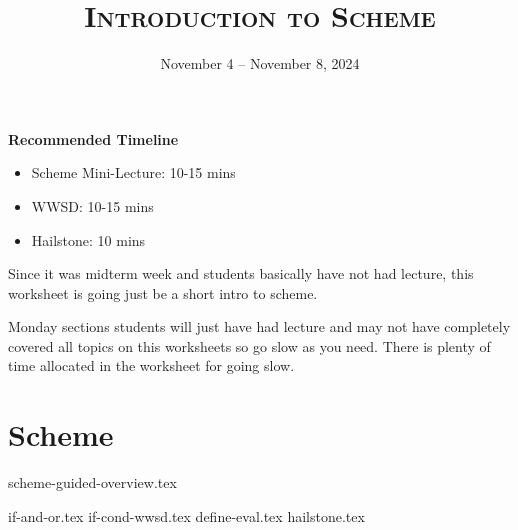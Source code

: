 \documentclass{exam}
\title{\textsc{Introduction to Scheme}}
\date{November 4 -- November 8, 2024}
\begin{document}
\maketitle
\begin{guide}
    \textbf{Recommended Timeline}
    \begin{itemize}
      \item Scheme Mini-Lecture: 10-15 mins
      \item WWSD: 10-15 mins
      \item Hailstone: 10 mins
    \end{itemize}

\begin{meta}
    Since it was midterm week and students basically have not had lecture, this worksheet is going just be a short intro to scheme. 
    
    Monday sections students will just have had lecture and may not have completely covered all topics on this worksheets so go slow as you need. There is plenty of time allocated in the worksheet for going slow.
\end{meta}
\end{guide}


\section{Scheme}
{scheme-guided-overview.tex}
\begin{questions}
    {if-and-or.tex}
    {if-cond-wwsd.tex}
    {define-eval.tex}
    {hailstone.tex}
\end{questions}
\end{document}
